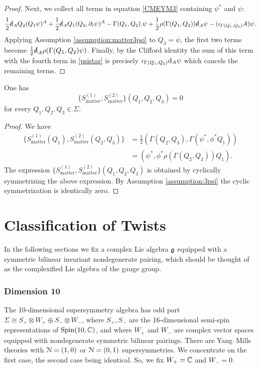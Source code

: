 \documentclass[10pt, oneside]{article}
\newcommand{\matter}{\mathrm{matter}}
\begin{document}
\begin{proof}
Next, we collect all terms in equation \eqref{CMEYM3} containing $\psi^*$ and $\psi$:
\begin{equation}\label{psistar}
\frac{1}{2} \sd \d_A Q_2(Q_1 \psi)^A + \frac{1}{2} \sd \d_A Q_1(Q_2, \partial_i\psi)^A - \Gamma(Q_1,Q_2) . \psi + \frac{1}{2} \rho(\Gamma(Q_1,Q_2)) \sd \d_A \psi - (\iota_{\Gamma(Q_1, Q_2)} A)\psi.
\end{equation}
Applying Assumption \ref{assumption:matter3psi} to $Q_3 = \psi$, the first two terms become $\frac{1}{2} \sd \d_A \rho(\Gamma(Q_1,Q_2) \psi)$. 
Finally, by the Clifford identity the sum of this term with the fourth term in \eqref{psistar} is precisely $\iota_{\Gamma(Q_1,Q_2)}{\rm d}_A \psi$ which cancels the remaining terms.
\end{proof}

\begin{lemma}
One has
\[\{S_{\matter}^{(1)}, S_{\matter}^{(2)}\}(Q_1, Q_2, Q_3) = 0\]
for every $Q_1, Q_2, Q_3\in \Sigma$.
\end{lemma}
\begin{proof}
We have
\begin{align*}
\{S_{\matter}^{(1)}(Q_1), S_{\matter}^{(2)}(Q_2, Q_3)\} & = \frac{1}{2} (\Gamma(Q_2, Q_3), \Gamma(\psi^*, \phi^* Q_1)) \\ & = (\psi^*, \phi^* \rho(\Gamma(Q_2,Q_3)) Q_1)  .
\end{align*}
The expression
$\{S_{\matter}^{(1)}, S_{\matter}^{(2)}\}(Q_1,Q_2,Q_3)$ is obtained by cyclically symmetrizing the above expression. By Assumption \ref{assumption:3psi} the cyclic symmetrization is identically zero.
\end{proof}

\part{Classification of Twists} \label{classification_part}

In the following sections we fix a complex Lie algebra $\mathfrak g$ equipped with a symmetric bilinear invariant nondegenerate pairing, which should be thought of as the complexified Lie algebra of the gauge group.

\section{Dimension 10}

The 10-dimensional supersymmetry algebra has odd part $\Sigma\cong S_+\otimes W_+\oplus S_-\otimes W_-$, where $S_+, S_-$ are the 16-dimensional semi-spin representations of $\mathrm{Spin}(10, \mathbb C)$, and where $W_+$ and $W_-$ are complex vector spaces equipped with nondegenerate symmetric bilinear pairings. There are Yang--Mills theories with $\mathcal N=(1, 0)$ or $\mathcal N=(0, 1)$ supersymmetries. We concentrate on the first case, the second case being identical. So, we fix $W_+=\mathbb C$ and $W_- = 0$.
\end{document}

